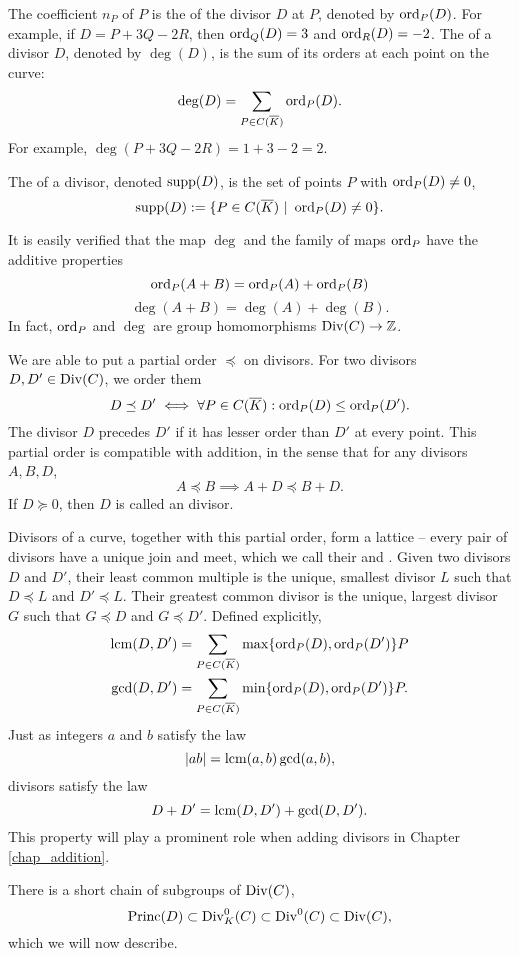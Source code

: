 The coefficient $n_P$ of $P$ is the  of the divisor $D$ at $P$, denoted by $\operatorname{ord}_P(D)$.
For example, if $D = P + 3Q - 2R$, then $\operatorname{ord}_Q(D) = 3$ and $\operatorname{ord}_R(D) = -2$.
The  of a divisor $D$, denoted by $\deg(D)$, is the sum of its orders at each point on the curve:
  \[ \deg(D) = \sum_{P \in C(\overline K)} \operatorname{ord}_P(D). \]
For example, $\deg(P + 3Q - 2R) = 1 + 3 - 2 = 2$.

The  of a divisor, denoted $\operatorname{supp}(D)$, is the set of points $P$ with $\operatorname{ord}_P(D) \neq 0$,
\[ \operatorname{supp}(D) := \{ P \in C(\overline K) ~|~ \operatorname{ord}_P(D) \neq 0 \}. \]

It is easily verified that the map $\deg$ and the family of maps $\operatorname{ord}_P$ have the additive properties
  \[ \operatorname{ord}_P(A + B) = \operatorname{ord}_P(A) + \operatorname{ord}_P(B) \]
  \[ \deg(A + B) = \deg(A) + \deg(B). \]
In fact, $\operatorname{ord}_P$ and $\deg$ are group homomorphisms $\operatorname{Div}(C) \to \mathbb{Z}$.

We are able to put a partial order $\preceq$ on divisors.
For two divisors $D,D' \in \operatorname{Div}(C)$,
we order them
  \[ D \preceq D' \iff \forall P \in C(\overline K) : \operatorname{ord}_P(D) \leq \operatorname{ord}_P(D'). \]
The divisor $D$ precedes $D'$ if it has lesser order than $D'$ at every point.
This partial order is compatible with addition, in the sense that for any divisors $A, B, D$,
  \[ A \preceq B \implies A + D \preceq B + D. \]
If $D \succeq 0$, then $D$ is called an  divisor.

Divisors of a curve, together with this partial order, form a lattice --
every pair of divisors have a unique join and meet,
which we call their  and .
Given two divisors $D$ and $D'$, their least common multiple is the unique, smallest divisor $L$
such that $D \preceq L$ and $D' \preceq L$.
Their greatest common divisor is the unique, largest divisor $G$ such that $G \preceq D$ and $G \preceq D'$.
Defined explicitly,
\begin{align*}
  \operatorname{lcm}(D, D') &= \sum_{P \in C(\overline K)}\max\{\operatorname{ord}_P(D), \operatorname{ord}_P(D')\}P \\
  \gcd(D, D') &= \sum_{P \in C(\overline K)}\min\{\operatorname{ord}_P(D), \operatorname{ord}_P(D')\}P.
\end{align*}
Just as integers $a$ and $b$ satisfy the law
  \[ \left| ab \right| = \operatorname{lcm}(a,b)\gcd(a,b), \]
divisors satisfy the law
  \[ D + D' = \operatorname{lcm}(D, D') + \gcd(D, D'). \]
This property will play a prominent role when adding divisors in Chapter \ref{chap_addition}.

There is a short chain of subgroups of $\operatorname{Div}(C)$,
\[ \operatorname{Princ}(D) \subset \operatorname{Div}_K^0(C) \subset \operatorname{Div}^0(C) \subset \operatorname{Div}(C), \]
which we will now describe.

